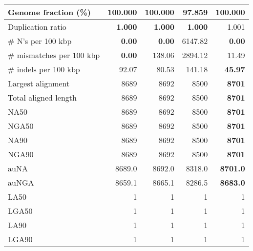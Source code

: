 \documentclass[12pt,a4paper]{article}
\begin{document}
\begin{table}[ht]
\begin{center}
\begin{tabular}{|l*{4}{|r}|}
Genome fraction (\%) & {\bf 100.000} & {\bf 100.000} & 97.859 & {\bf 100.000} \\ \hline
Duplication ratio & {\bf 1.000} & {\bf 1.000} & {\bf 1.000} & 1.001 \\ \hline
\# N's per 100 kbp & {\bf 0.00} & {\bf 0.00} & 6147.82 & {\bf 0.00} \\ \hline
\# mismatches per 100 kbp & {\bf 0.00} & 138.06 & 2894.12 & 11.49 \\ \hline
\# indels per 100 kbp & 92.07 & 80.53 & 141.18 & {\bf 45.97} \\ \hline
Largest alignment & 8689 & 8692 & 8500 & {\bf 8701} \\ \hline
Total aligned length & 8689 & 8692 & 8500 & {\bf 8701} \\ \hline
NA50 & 8689 & 8692 & 8500 & {\bf 8701} \\ \hline
NGA50 & 8689 & 8692 & 8500 & {\bf 8701} \\ \hline
NA90 & 8689 & 8692 & 8500 & {\bf 8701} \\ \hline
NGA90 & 8689 & 8692 & 8500 & {\bf 8701} \\ \hline
auNA & 8689.0 & 8692.0 & 8318.0 & {\bf 8701.0} \\ \hline
auNGA & 8659.1 & 8665.1 & 8286.5 & {\bf 8683.0} \\ \hline
LA50 & 1 & 1 & 1 & 1 \\ \hline
LGA50 & 1 & 1 & 1 & 1 \\ \hline
LA90 & 1 & 1 & 1 & 1 \\ \hline
LGA90 & 1 & 1 & 1 & 1 \\ \hline
\end{tabular}
\end{center}
\end{table}
\end{document}
